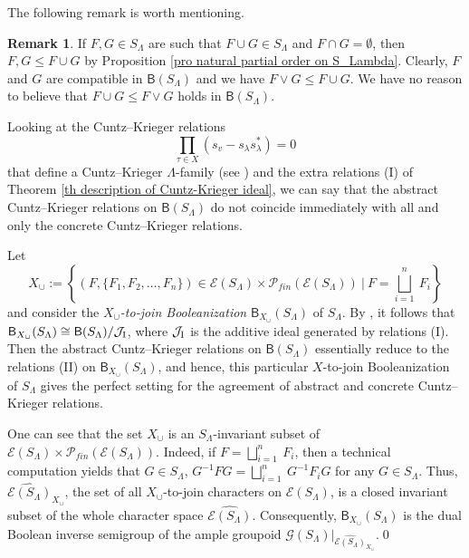 \documentclass[a4paper,reqno,11pt]{amsart}
\numberwithin{equation}{section}
\theoremstyle{definition}
\newtheorem{rmk}[thm]{Remark}
\theoremstyle{remark}
\begin{document}
The following remark is worth mentioning.
\begin{rmk}\label{rem abstract CK relations and X-to-join}
If $F,G\in S_\Lambda$ are such that $F\cup G\in S_\Lambda$ and $F\cap G=\emptyset$, then $F,G\le F\cup G$ by Proposition \ref{pro natural partial order on S_Lambda}. Clearly, $F$ and $G$ are compatible in $\mathsf{B}(S_\Lambda)$ and we have $F\vee G\le F\cup G$. We have no reason to believe that $F\cup G\le F\vee G$ holds in $\mathsf{B}(S_\Lambda)$. 


Looking at the Cuntz--Krieger relations \[\displaystyle{\prod_{\tau\in X}}(s_v-s_{\lambda}s_{\lambda}^*)=0\] that define a Cuntz--Krieger $\Lambda$-family (see \cite{Farthing,Yeend}) and the extra relations (I) of Theorem \ref{th description of Cuntz-Krieger ideal}, we can say that the abstract Cuntz--Krieger relations on $\mathsf{B}(S_\Lambda)$ do not coincide immediately with all and only the concrete Cuntz--Krieger relations.

Let \[X_{\cup}:=\left\{\left(F,\{F_1,F_2,\ldots,F_n\}\right)\in \mathcal{E}(S_\Lambda)\times \mathcal{P}_{fin}(\mathcal{E}(S_\Lambda))~|~F=\displaystyle{\bigsqcup_{i=1}^{n}}~F_i\right\}\] and consider the \emph{$X_{\cup}$-to-join Booleanization} \cite{GannaX} $\mathsf{B}_{X_{\cup}}(S_\Lambda)$ of $S_\Lambda$. By \cite[Corollary 5.4$(2)$]{GannaX}, it follows that $\mathsf{B}_{X_{\cup}}(S_\Lambda)\cong \mathsf{B}(S_\Lambda)/{\mathcal{J}_{\textup{I}}}$, where $\mathcal{J}_{\textup{I}}$ is the additive ideal generated by relations (I). Then the abstract Cuntz--Krieger relations on $\mathsf{B}(S_\Lambda)$ essentially reduce to the relations (II) on $\mathsf{B}_{X_{\cup}}(S_\Lambda)$, and hence, this particular $X$-to-join Booleanization of $S_\Lambda$ gives the perfect setting for the agreement of abstract and concrete Cuntz--Krieger relations. 

One can see that the set $X_{\cup}$ is an $S_\Lambda$-invariant subset \cite[Definition 3.7]{GannaX} of $\mathcal{E}(S_\Lambda)\times \mathcal{P}_{fin}(\mathcal{E}(S_\Lambda))$. Indeed, if $F=\displaystyle{\bigsqcup_{i=1}^{n}}~F_i$, then a technical computation yields that $G\in S_\Lambda$, $G^{-1}FG=\displaystyle{\bigsqcup_{i=1}^{n}}~G^{-1}F_i G$ for any $G\in S_\Lambda$. Thus, $\widehat{\mathcal{E}(S_\Lambda)}_{X_\cup}$, the set of all $X_\cup$-to-join characters on $\mathcal{E}(S_\Lambda)$, is a closed invariant subset of the whole character space $\widehat{\mathcal{E}(S_\Lambda)}$. Consequently, $\mathsf{B}_{X_\cup}(S_\Lambda)$ is the dual Boolean inverse semigroup of the ample groupoid $\mathcal{G}(S_\Lambda)|_{\widehat{\mathcal{E}(S_\Lambda)}_{X_\cup}}$.\qed
\end{rmk}
\end{document}
